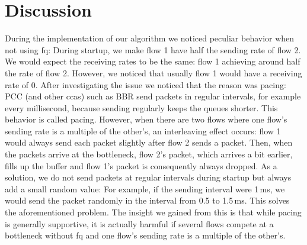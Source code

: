 \documentclass[runningheads]{llncs}
\begin{document}

\section{Discussion}

During the implementation of our algorithm we noticed peculiar behavior when not using \gls{fq}: During startup, we make flow 1 have half the sending rate of flow 2. We would expect the receiving rates to be the same: flow 1 achieving around half the rate of flow 2. However, we noticed that usually flow 1 would have a receiving rate of 0. After investigating the issue we noticed that the reason was pacing: PCC (and other \glspl{cca}) such as BBR send packets in regular intervals, for example every millisecond, because sending regularly keeps the queues shorter. This behavior is called pacing. However, when there are two flows where one flow's sending rate is a multiple of the other's, an interleaving effect occurs: flow 1 would always send each packet slightly after flow 2 sends a packet. Then, when the packets arrive at the bottleneck, flow 2's packet, which arrives a bit earlier, fills up the buffer and flow 1's packet is consequently always dropped. As a solution, we do not send packets at regular intervals during startup but always add a small random value: For example, if the sending interval were 1\,ms, we would send the packet randomly in the interval from 0.5 to 1.5\,ms. This solves the aforementioned problem. The insight we gained from this is that while pacing is generally supportive, it is actually harmful if several flows compete at a bottleneck without \gls{fq} and one flow's sending rate is a multiple of the other's.
\end{document}

